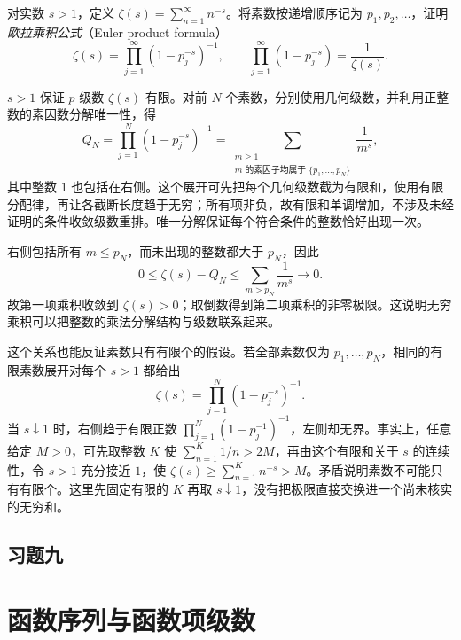 \documentclass[UTF8,12pt,a4paper,fontset=fandol]{ctexbook}
\begin{document}
\begin{example}
\label{ex:euler-product-zeta}
对实数 $s>1$，定义 $\zeta(s)=\sum_{n=1}^{\infty}n^{-s}$。将素数按递增顺序记为 $p_1,p_2,\ldots$，证明\emph{欧拉乘积公式}（Euler product formula）
\begin{equation}
    \zeta(s)=\prod_{j=1}^{\infty}(1-p_j^{-s})^{-1},
    \qquad
    \prod_{j=1}^{\infty}(1-p_j^{-s})=\frac1{\zeta(s)}.
    \label{eq:euler-product-zeta}
\end{equation}
\end{example}

\begin{solve}
$s>1$ 保证 $p$ 级数 $\zeta(s)$ 有限。对前 $N$ 个素数，分别使用几何级数，并利用正整数的素因数分解唯一性，得
\[
    Q_N=\prod_{j=1}^N(1-p_j^{-s})^{-1}
       =\sum_{\substack{m\geq1\\m\text{ 的素因子均属于 }\{p_1,\ldots,p_N\}}}\frac1{m^s},
\]
其中整数 $1$ 也包括在右侧。这个展开可先把每个几何级数截为有限和，使用有限分配律，再让各截断长度趋于无穷；所有项非负，故有限和单调增加，不涉及未经证明的条件收敛级数重排。唯一分解保证每个符合条件的整数恰好出现一次。

右侧包括所有 $m\leq p_N$，而未出现的整数都大于 $p_N$，因此
\[
    0\leq\zeta(s)-Q_N\leq\sum_{m>p_N}\frac1{m^s}\longrightarrow0.
\]
故第一项乘积收敛到 $\zeta(s)>0$；取倒数得到第二项乘积的非零极限。这说明无穷乘积可以把整数的乘法分解结构与级数联系起来。

这个关系也能反证素数只有有限个的假设。若全部素数仅为 $p_1,\ldots,p_N$，相同的有限素数展开对每个 $s>1$ 都给出
\[
    \zeta(s)=\prod_{j=1}^N(1-p_j^{-s})^{-1}.
\]
当 $s\downarrow1$ 时，右侧趋于有限正数 $\prod_{j=1}^N(1-p_j^{-1})^{-1}$，左侧却无界。事实上，任意给定 $M>0$，可先取整数 $K$ 使 $\sum_{n=1}^K1/n>2M$，再由这个有限和关于 $s$ 的连续性，令 $s>1$ 充分接近 $1$，使 $\zeta(s)\geq\sum_{n=1}^K n^{-s}>M$。矛盾说明素数不可能只有有限个。这里先固定有限的 $K$ 再取 $s\downarrow1$，没有把极限直接交换进一个尚未核实的无穷和。
\end{solve}

\section*{习题九}

\chapter{函数序列与函数项级数}
\label{chap:function-sequences-and-series}
\end{document}
